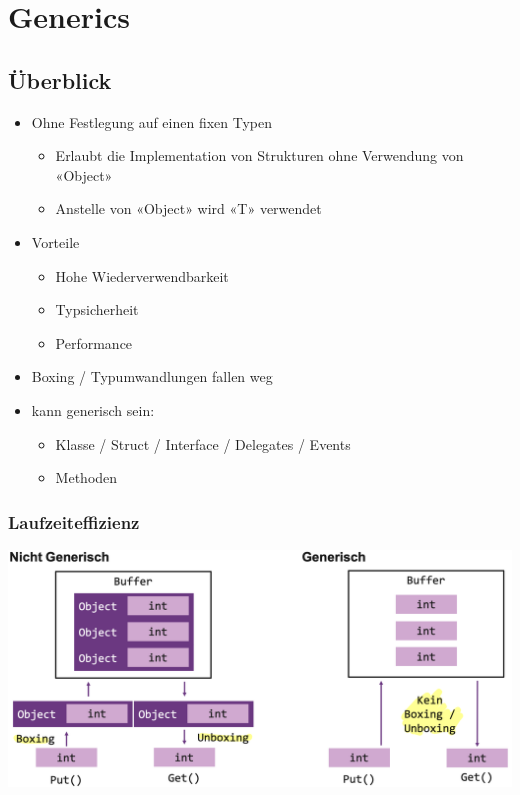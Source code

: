 
\section{Generics}

\subsection{Überblick}
\begin{itemize}
    \item Ohne Festlegung auf einen fixen Typen
    \begin{itemize}
        \item Erlaubt die Implementation von Strukturen ohne Verwendung von «Object»
        \item Anstelle von «Object» wird «T» verwendet
    \end{itemize}
    \item Vorteile
    \begin{itemize}
        \item Hohe Wiederverwendbarkeit
        \item Typsicherheit
        \item Performance
    \end{itemize}
    \item Boxing / Typumwandlungen fallen weg
    \item  kann generisch sein:
    \begin{itemize}
        \item Klasse / Struct / Interface / Delegates / Events
        \item Methoden
    \end{itemize}
\end{itemize}

\subsubsection{Laufzeiteffizienz}
\begin{center}
    \includegraphics[scale=.25]{graphic/generics/Laufzeiteffizienz.png}
\end{center}
\vspace{-8pt}


